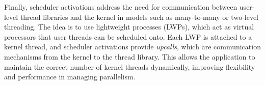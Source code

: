 Finally, scheduler activations address the need for communication between user-level thread libraries and the kernel in models such as many-to-many or two-level threading. The idea is to use lightweight processes (LWPs), which act as virtual processors that user threads can be scheduled onto. Each LWP is attached to a kernel thread, and scheduler activations provide \emph{upcalls}, which are communication mechanisms from the kernel to the thread library. This allows the application to maintain the correct number of kernel threads dynamically, improving flexibility and performance in managing parallelism.
